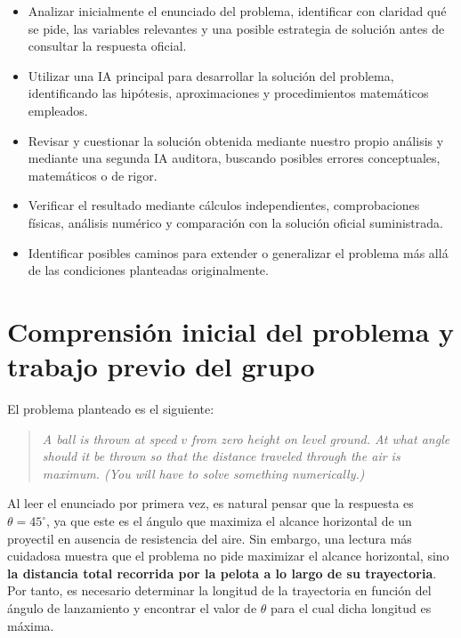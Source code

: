 \begin{itemize}
    \item Analizar inicialmente el enunciado del problema, identificar con claridad qué se pide, las variables relevantes y una posible estrategia de solución antes de consultar la respuesta oficial.
    
    \item Utilizar una IA principal para desarrollar la solución del problema, identificando las hipótesis, aproximaciones y procedimientos matemáticos empleados.
    
    \item Revisar y cuestionar la solución obtenida mediante nuestro propio análisis y mediante una segunda IA auditora, buscando posibles errores conceptuales, matemáticos o de rigor.
    
    \item Verificar el resultado mediante cálculos independientes, comprobaciones físicas, análisis numérico y comparación con la solución oficial suministrada.
    
    \item Identificar posibles caminos para extender o generalizar el problema más allá de las condiciones planteadas originalmente.
\end{itemize}



\section{Comprensión inicial del problema y trabajo previo del grupo}

El problema planteado es el siguiente:

\begin{quote}
\textit{A ball is thrown at speed $v$ from zero height on level ground. At what angle should it be thrown so that the distance traveled through the air is maximum. (You will have to solve something numerically.)}
\end{quote}

Al leer el enunciado por primera vez, es natural pensar que la respuesta es \(\theta=45^\circ\), ya que este es el ángulo que maximiza el alcance horizontal de un proyectil en ausencia de resistencia del aire. Sin embargo, una lectura más cuidadosa muestra que el problema no pide maximizar el alcance horizontal, sino \textbf{la distancia total recorrida por la pelota a lo largo de su trayectoria}. Por tanto, es necesario determinar la longitud de la trayectoria en función del ángulo de lanzamiento y encontrar el valor de \(\theta\) para el cual dicha longitud es máxima.

